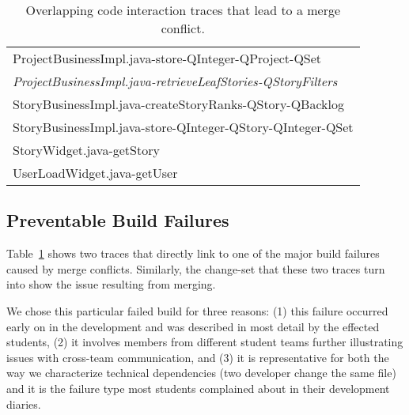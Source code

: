 \begin{table}[t!]
\begin{tabular}{@{\hspace{2pt}}l@{\hspace{2pt}}}
     ProjectBusinessImpl.java-store-QInteger-QProject-QSet        \\%
     \emph{ProjectBusinessImpl.java-retrieveLeafStories-QStoryFilters}                                 \\%
     StoryBusinessImpl.java-createStoryRanks-QStory-QBacklog                     \\%
     StoryBusinessImpl.java-store-QInteger-QStory-QInteger-QSet  \\%
     StoryWidget.java-getStory                                                       \\%
     UserLoadWidget.java-getUser                                                     \\%
      \bottomrule
\end{tabular}
\caption{Overlapping code interaction traces that lead to a merge conflict.}
\label{tab:overlappingtraces}
\end{table}

\subsection{Preventable Build Failures}
Table~\ref{tab:overlappingtraces} shows two traces that directly link to one of the major build failures caused by merge conflicts.
Similarly, the change-set that these two traces turn into show the issue resulting from merging.

We chose this particular failed build for three reasons:
(1) this failure occurred early on in the development and was described in most detail by the effected students,
(2) it involves members from different student teams further illustrating issues with cross-team communication,
and (3) it is representative for both the way we characterize technical dependencies (two developer change the same file) and it is the failure type most students complained about in their development diaries.

